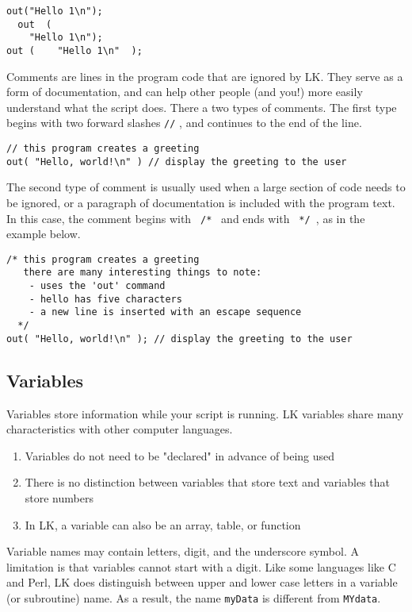 \documentclass{article}
\begin{document}
\begin{verbatim}
out("Hello 1\n");
  out  (
    "Hello 1\n");
out (    "Hello 1\n"  );
\end{verbatim}

Comments are lines in the program code that are ignored by LK.  They serve as a form of documentation, and can help other people (and you!) more easily understand what the script does.  There a two types of comments.  The first type begins with two forward slashes \texttt{//} , and continues to the end of the line.

\begin{verbatim}
// this program creates a greeting
out( "Hello, world!\n" ) // display the greeting to the user
\end{verbatim}

The second type of comment is usually used when a large section of code needs to be ignored, or a paragraph of documentation is included with the program text.  In this case, the comment begins with \texttt{ /* } and ends with \texttt{ */ }, as in the example below.

\begin{verbatim}
/* this program creates a greeting
   there are many interesting things to note:
    - uses the 'out' command
    - hello has five characters
    - a new line is inserted with an escape sequence
  */
out( "Hello, world!\n" ); // display the greeting to the user
\end{verbatim}

\subsection{Variables}

Variables store information while your script is running.  LK variables share many characteristics with other computer languages.
\begin{enumerate}
\item Variables do not need to be "declared" in advance of being used
\item There is no distinction between variables that store text and variables that store numbers
\item In LK, a variable can also be an array, table, or function
\end{enumerate}

Variable names may contain letters, digit, and the underscore symbol.  A limitation is that variables cannot start with a digit.  Like some languages like C and Perl, LK does distinguish between upper and lower case letters in a variable (or subroutine) name. As a result, the name \texttt{myData} is different from \texttt{MYdata}.
\end{document}
